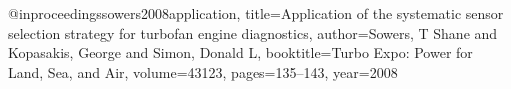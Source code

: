 @inproceedings{sowers2008application,
  title={Application of the systematic sensor selection strategy for turbofan engine diagnostics},
  author={Sowers, T Shane and Kopasakis, George and Simon, Donald L},
  booktitle={Turbo Expo: Power for Land, Sea, and Air},
  volume={43123},
  pages={135--143},
  year={2008}
}